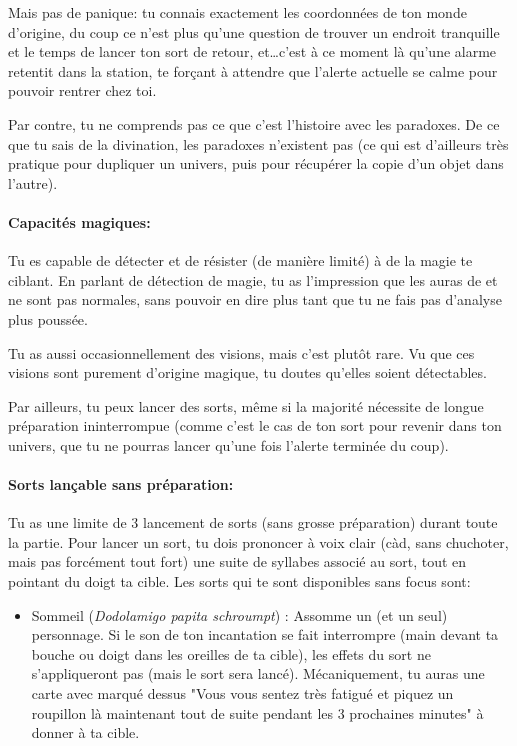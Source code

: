 {	\par Mais pas de panique: tu connais exactement les coordonnées de ton monde d'origine, du coup ce n'est plus qu'une question de trouver un endroit tranquille et le temps de lancer ton sort de retour, et\dots c'est à ce moment là qu'une alarme retentit dans la station, te forçant à attendre que l'alerte actuelle se calme pour pouvoir rentrer chez toi.
	
	\par Par contre, tu ne comprends pas ce que c'est l'histoire avec les paradoxes. De ce que tu sais de la divination, les paradoxes n'existent pas (ce qui est d'ailleurs très pratique pour dupliquer un univers, puis pour récupérer la copie d'un objet dans l'autre).
	
	
	\paragraph{Capacités magiques:} Tu es capable de détecter et de résister (de manière limité) à de la magie te ciblant. En parlant de détection de magie, tu as l'impression que les auras de \nmPlayerXI et \nmPlayerIX ne sont pas normales, sans pouvoir en dire plus tant que tu ne fais pas d'analyse plus poussée.
	
	\par Tu as aussi occasionnellement des visions, mais c'est plutôt rare. Vu que ces visions sont purement d'origine magique, tu doutes qu'elles soient détectables.
	
	\par Par ailleurs, tu peux lancer des sorts, même si la majorité nécessite de longue préparation ininterrompue (comme c'est le cas de ton sort pour revenir dans ton univers, que tu ne pourras lancer qu'une fois l'alerte terminée du coup). 
	
	\paragraph{Sorts lançable sans préparation:} Tu as une limite de 3 lancement de sorts (sans grosse préparation) durant toute la partie. Pour lancer un sort, tu dois prononcer à voix clair (càd, sans chuchoter, mais pas forcément tout fort) une suite de syllabes associé au sort, tout en pointant du doigt ta cible. Les sorts qui te sont disponibles sans focus sont:
	\begin{itemize}
		\item Sommeil (\emph{Dodolamigo papita schroumpt}) : Assomme un (et un seul) personnage. Si le son de ton incantation se fait interrompre (main devant ta bouche ou doigt dans les oreilles de ta cible), les effets du sort ne s'appliqueront pas (mais le sort sera lancé). Mécaniquement, tu auras une carte avec marqué dessus "Vous vous sentez très fatigué et piquez un roupillon là maintenant tout de suite pendant les 3 prochaines minutes" à donner à ta cible.
		

\end{itemize}}
